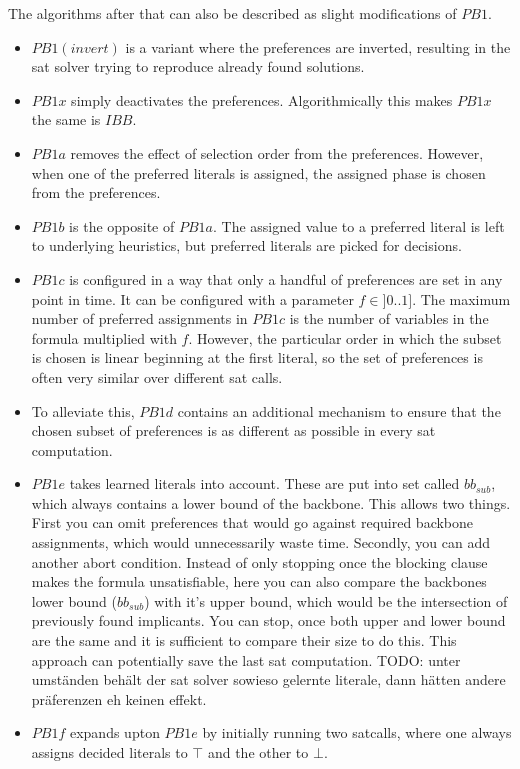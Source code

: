 The algorithms after that can also be described as slight modifications of $PB1$.
\begin{itemize}
	\item $PB1(invert)$ is a variant where the preferences are inverted, resulting in the sat solver trying to reproduce already found solutions. 
	\item $PB1x$ simply deactivates the preferences. Algorithmically this makes $PB1x$ the same is $IBB$.
	\item $PB1a$ removes the effect of selection order from the preferences. However, when one of the preferred literals is assigned, the assigned phase is chosen from the preferences.
	\item $PB1b$ is the opposite of $PB1a$. The assigned value to a preferred literal is left to underlying heuristics, but preferred literals are picked for decisions.
	\item $PB1c$ is configured in a way that only a handful of preferences are set in any point in time. It can be configured with a parameter $f \in ]0..1]$. The maximum number of preferred assignments in $PB1c$ is the number of variables in the formula multiplied with $f$. However, the particular order in which the subset is chosen is linear beginning at the first literal, so the set of preferences is often very similar over different sat calls.
	\item To alleviate this, $PB1d$ contains an additional mechanism to ensure that the chosen subset of preferences is as different as possible in every sat computation.
	\item $PB1e$ takes learned literals into account. These are put into set called $bb_{sub}$, which always contains a lower bound of the backbone. This allows two things. First you can omit preferences that would go against required backbone assignments, which would unnecessarily waste time. Secondly, you can add another abort condition. Instead of only stopping once the blocking clause makes the formula unsatisfiable, here you can also compare the backbones lower bound ($bb_{sub}$) with it's upper bound, which would be the intersection of previously found implicants. You can stop, once both upper and lower bound are the same and it is sufficient to compare their size to do this. This approach can potentially save the last sat computation.
	TODO: unter umständen behält der sat solver sowieso gelernte literale, dann hätten andere präferenzen eh keinen effekt.
	\item $PB1f$ expands upton $PB1e$ by initially running two satcalls, where one always assigns decided literals to $\top$ and the other to $\bot$. 
\end{itemize}

